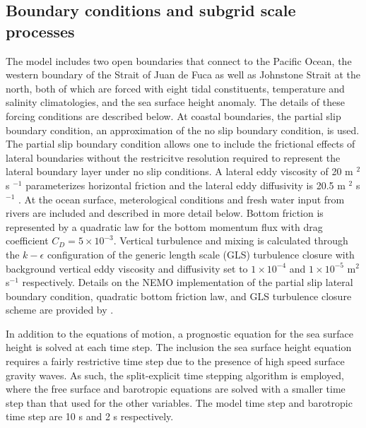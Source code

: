 \documentclass[pdftex,10pt]{article}
\begin{document}
\subsection{Boundary conditions and subgrid scale processes}
The model includes two open boundaries that connect to the Pacific Ocean, the western boundary of the Strait of Juan de Fuca as well as Johnstone Strait at the north, both of which are forced with eight tidal constituents, temperature and salinity climatologies, and the sea surface height anomaly. The details of these forcing conditions are described below. At coastal boundaries, the partial slip boundary condition, an approximation of the no slip boundary condition, is used. The partial slip boundary condition allows one to include the frictional effects of lateral boundaries without the restricitve resolution required to represent the lateral boundary layer under no slip conditions. A lateral eddy viscosity of 20 m $^2$ s $^{-1}$ parameterizes horizontal friction and the lateral eddy diffusivity is 20.5 m $^2$ s $^{-1}$ . At the ocean surface, meterological conditions and fresh water input from rivers are included and described in more detail below. Bottom friction is represented by a quadratic law for the bottom momentum flux with drag coefficient $C_D = 5\times 10^{-3}$. Vertical turbulence and mixing is calculated through the $k-\epsilon$ configuration of the generic length scale (GLS) turbulence closure \citep{umlauf2003generic} with background vertical eddy viscosity and diffusivity set to $1\times10^{-4}$ and $1\times10^{-5}$ m$^2$ s$^{-1}$ respectively. Details on the NEMO implementation of the partial slip lateral boundary condition, quadratic bottom friction law, and GLS turbulence closure scheme are provided by \citep{madec2008nemo}.

In addition to the equations of motion, a prognostic equation for the sea surface height is solved at each time step. The inclusion the sea surface height equation requires a fairly restrictive time step due to the presence of high speed surface gravity waves. As such, the split-explicit time stepping algorithm is employed, where the free surface and barotropic equations are solved with a smaller time step than that used for the other variables. The model time step and barotropic time step are 10 s and 2 s respectively. 
\end{document}
